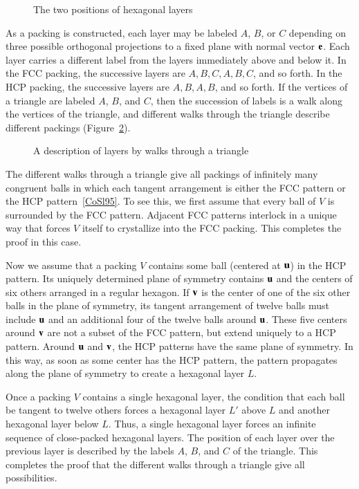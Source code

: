 \begin{figure}[htb]
  \centering
  \caption{The two positions of hexagonal layers}
  \label{fig:two-holes}
\end{figure}

As a packing is constructed, each layer may be labeled
$A$, $B$, or $C$ depending on three possible orthogonal projections to a fixed plane
with normal vector ${\mathbf e}$.
Each layer carries a different label from the layers immediately
above and below it.  In the FCC packing, the successive layers are
$A,B,C,A,B,C$, and so forth.  In the HCP packing, the successive layers are
$A,B,A,B$, and so forth.  If the vertices of a triangle are labeled $A$, $B$, and $C$,
then the succession of labels is a
walk along the vertices of the triangle, and different walks through the
triangle describe different packings (Figure~\ref{fig:fcc-tri}).

\begin{figure}[htb]
  \centering
  \caption{A description of layers by walks through a triangle}
  \label{fig:fcc-tri}
\end{figure}

The different walks through a triangle give all packings of infinitely
many congruent balls in which each tangent arrangement is
either the FCC pattern  or the HCP pattern~\ref{CoSl95}.  To see
this, we first assume that every ball of $V$ is surrounded by the FCC pattern.  
Adjacent FCC patterns interlock in a unique way
that forces $V$ itself to crystallize into the
FCC packing.  This completes the proof in this case.

Now we assume that a packing $V$ contains some ball (centered at ${\mathbf u}$)
in the HCP pattern. Its uniquely determined
plane of symmetry contains ${\mathbf u}$ and the centers of six
others arranged in a regular hexagon. If ${\mathbf v}$ is the center of one of
the six other balls in the plane of symmetry, its  tangent arrangement
of twelve balls must include ${\mathbf u}$ and an additional four of the
twelve balls around ${\mathbf u}$. These five centers around ${\mathbf v}$ are not a
subset of the FCC pattern, but  extend uniquely to
a HCP pattern.   Around ${\mathbf u}$ and ${\mathbf v}$, the HCP patterns  have the same
plane of symmetry. In this way, as
soon as some center has the HCP pattern, the pattern
propagates along the plane of symmetry to create a hexagonal layer
$L$.

Once a packing $V$ contains a single hexagonal layer, the condition
that each ball be tangent to twelve others forces a hexagonal layer
$L'$ above $L$ and another hexagonal layer below $L$.  Thus, a single
hexagonal layer forces an infinite sequence of close-packed hexagonal
layers.  The position of each layer over the previous layer is described 
by the labels $A$, $B$, and $C$ of the triangle.
This completes the proof that the different walks through a triangle give
all possibilities.



